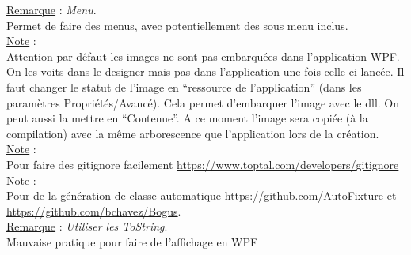\documentclass[a4paper,12pt,twoside]{article}
\newcommand{\rem}[2]{\noindent\underline{Remarque} : \textit{#1}.\\ \indent #2}
\newcommand{\note}[1]{\noindent\underline{Note} : \\ \indent #1}
\begin{document}
\rem{Menu}{Permet de faire des menus, avec potentiellement des sous menu inclus.}\\

\note{Attention par défaut les images ne sont pas embarquées dans l'application WPF. On les voits dans le designer mais pas dans l'application une fois celle ci lancée. Il faut changer le statut de l'image en ``ressource de l'application'' (dans les paramètres Propriétés/Avancé). Cela permet d'embarquer l'image avec le dll. On peut aussi la mettre en ``Contenue''. A ce moment l'image sera copiée (à la compilation) avec la même arborescence que l'application lors de la création.}\\

\note{Pour faire des gitignore facilement \url{https://www.toptal.com/developers/gitignore}}\\

\note{Pour de la génération de classe automatique \url{https://github.com/AutoFixture} et \url{https://github.com/bchavez/Bogus}.}\\

\rem{Utiliser les ToString}{Mauvaise pratique pour faire de l'affichage en WPF}\\


\newpage
\printglossary[type=\acronymtype]%
\glsaddallunused %
\printglossary[type = main,nonumberlist]%
\end{document}
